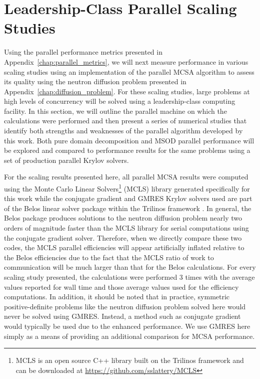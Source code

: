 \section{Leadership-Class Parallel Scaling Studies\ }
\label{sec:leadership_scaling_studies}
Using the parallel performance metrics presented in
Appendix~\ref{chap:parallel_metrics}, we will next measure performance
in various scaling studies using an implementation of the parallel
MCSA algorithm to assess its quality using the neutron diffusion
problem presented in Appendix~\ref{chap:diffusion_problem}. For these
scaling studies, large problems at high levels of concurrency will be
solved using a leadership-class computing facility. In this section,
we will outline the parallel machine on which the calculations were
performed and then present a series of numerical studies that identify
both strengths and weaknesses of the parallel algorithm developed by
this work. Both pure domain decomposition and MSOD parallel
performance will be explored and compared to performance results for
the same problems using a set of production parallel Krylov solvers.

For the scaling results presented here, all parallel MCSA results were
computed using the Monte Carlo Linear Solvers\footnote{MCLS is an open
  source C++ library built on the Trilinos framework and can be
  downloaded at \url{https://github.com/sslattery/MCLS}} (MCLS)
library generated specifically for this work while the conjugate
gradient and GMRES Krylov solvers used are part of the Belos linear
solver package within the Trilinos framework
\cite{heroux_overview_2005}. In general, the Belos package produces
solutions to the neutron diffusion problem nearly two orders of
magnitude faster than the MCLS library for serial computations using
the conjugate gradient solver. Therefore, when we directly compare
these two codes, the MCLS parallel efficiencies will appear
artificially inflated relative to the Belos efficiencies due to the
fact that the MCLS ratio of work to communication will be much larger
than that for the Belos calculations. For every scaling study
presented, the calculations were performed 3 times with the average
values reported for wall time and those average values used for the
efficiency computations. In addition, it should be noted that in
practice, symmetric positive-definite problems like the neutron
diffusion problem solved here would never be solved using
GMRES. Instead, a method such as conjugate gradient would typically be
used due to the enhanced performance. We use GMRES here simply as a
means of providing an additional comparison for MCSA performance.


